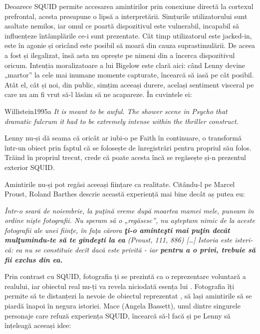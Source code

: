 \documentclass[12pt]{article}
\begin{document}
Deoarece SQUID permite accesarea amintirilor prin conexiune directă la cortexul prefrontal, acesta presupune o lipsă a interpretării. Simțurile utilizatorului sunt asaltate nemilos, iar omul ce poartă dispozitivul este vulnerabil, incapabil să influențeze întâmplările ce-i sunt prezentate. Cât timp utilizatorul este jacked-in, este în agonie și oricând este posibil să moară din cauza suprastimulării. De aceea a fost și ilegalizat, însă asta nu oprește pe nimeni din a încerca dispozitivul oricum. Intenția moralizatoare a lui Bigelow este clară aici: când Lenny devine „martor” la cele mai inumane momente capturate, încearcă să iasă pe cât posibil. Atât el, cât și noi, din public, simțim aceeași durere, același sentiment visceral pe care nu am fi vrut să-l lăsăm să ne acapareze. În cuvintele ei:\par

\begin{displaycquote}{Willistein1995a}
	\textit{It is meant to be awful. The shower scene in \textit{Psycho} \textemdash that dramatic fulcrum \textemdash it had to be extremely intense within the thriller construct.}
\end{displaycquote}

Lenny nu-și dă seama că oricât ar iubi-o pe Faith în continuare, o transformă într-un obiect prin faptul că se folosește de înregistrări pentru propriul său folos. Trăind în propriul trecut, crede că poate acesta încă se regăsește și-n prezentul exterior SQUID.\par

Amintirile nu-și pot regăsi aceeași ființare ca realitate. Citându-l pe Marcel Proust, Roland Barthes descrie această experiență mai bine decât aș putea eu:

\begin{displayquote}
	\textit{Într-o seară de noiembrie, la puţină vreme după moartea mamei mele, puneam în ordine nişte fotografii. Nu speram să o „regăsesc”, nu aşteptam nimic de la \guillemetleft aceste fotografii ale unei fiinţe, în faţa cărora \textbf{ţi-o aminteşti mai puţin decât mulţumindu-te să te gîndeşti la ea}\guillemetright\: (Proust, 111, 886) […] Istoria este isteri­că: ea nu se constituie decît dacă este privită - iar \textbf{pentru a o privi, trebuie să fii exclus din ea.}}
\end{displayquote}

Prin contrast cu SQUID, fotografia ți se prezintă ca o reprezentare voluntară a realului, iar obiectul real nu-ți va revela niciodată esența lui \cite{BarthesCameraluminoasa2009a}. Fotografia îți permite să te distanțezi la nevoie de obiectul reprezentat \cite{secSontagPlatosCavea}, să lași amintirile să se piardă înapoi în negura istoriei. Mace (Angela Bassett), unul dintre singurele personaje care refuză experiența SQUID, încearcă să-l facă și pe Lenny să înțeleagă aceeași idee:\par
\end{document}
